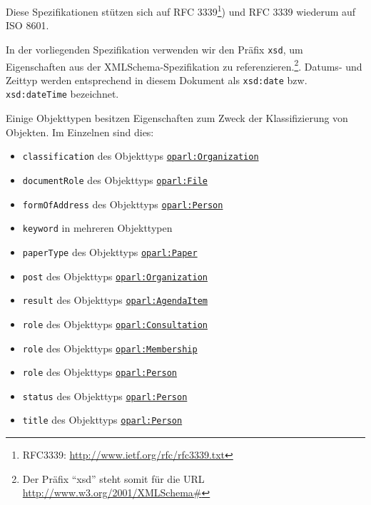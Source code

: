 \documentclass[,a4paper]{article}
\begin{document}
Diese Spezifikationen stützen sich auf RFC 3339\footnote{RFC3339:
  \url{http://www.ietf.org/rfc/rfc3339.txt}}) und RFC 3339 wiederum auf
ISO 8601.

In der vorliegenden Spezifikation verwenden wir den Präfix \texttt{xsd},
um Eigenschaften aus der XMLSchema-Spezifikation zu
referenzieren.\footnote{Der Präfix ``xsd'' steht somit für die URL
  \url{http://www.w3.org/2001/XMLSchema\#}}. Datums- und Zeittyp werden
entsprechend in diesem Dokument als \texttt{xsd:date} bzw.
\texttt{xsd:dateTime} bezeichnet.


Einige Objekttypen besitzen Eigenschaften zum Zweck der Klassifizierung
von Objekten. Im Einzelnen sind dies:

\begin{itemize}
\itemsep1pt\parskip0pt
\item
  \texttt{classification} des Objekttyps
  \hyperref[oparlux5forganization]{\texttt{oparl:Organization}}
\item
  \texttt{documentRole} des Objekttyps
  \hyperref[oparlux5fdocument]{\texttt{oparl:File}}
\item
  \texttt{formOfAddress} des Objekttyps
  \hyperref[oparlux5fperson]{\texttt{oparl:Person}}
\item
  \texttt{keyword} in mehreren Objekttypen
\item
  \texttt{paperType} des Objekttyps
  \hyperref[oparlux5fpaper]{\texttt{oparl:Paper}}
\item
  \texttt{post} des Objekttyps
  \hyperref[oparlux5forganization]{\texttt{oparl:Organization}}
\item
  \texttt{result} des Objekttyps
  \hyperref[oparlux5fagendaitem]{\texttt{oparl:AgendaItem}}
\item
  \texttt{role} des Objekttyps
  \hyperref[oparlux5fconsultation]{\texttt{oparl:Consultation}}
\item
  \texttt{role} des Objekttyps
  \hyperref[oparlux5fmembership]{\texttt{oparl:Membership}}
\item
  \texttt{role} des Objekttyps
  \hyperref[oparlux5fperson]{\texttt{oparl:Person}}
\item
  \texttt{status} des Objekttyps
  \hyperref[oparlux5fperson]{\texttt{oparl:Person}}
\item
  \texttt{title} des Objekttyps
  \hyperref[oparlux5fperson]{\texttt{oparl:Person}}
\end{itemize}
\end{document}
